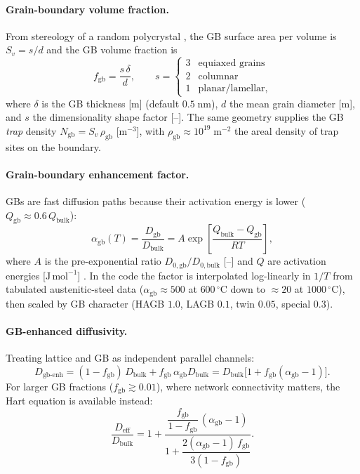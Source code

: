 \documentclass[11pt,a4paper]{article}
\newcommand{\Deff}{D_{\mathrm{eff}}}
\newcommand{\fgb}{f_{\mathrm{gb}}}
\begin{document}
\paragraph{Grain-boundary volume fraction.} From stereology of a random
polycrystal \citep{underwood1970}, the GB surface area per volume is
$S_v = s/d$ and the GB volume fraction is
\begin{equation}
  \fgb = \frac{s\,\delta}{d}, \qquad
  s = \begin{cases} 3 & \text{equiaxed grains}\\ 2 & \text{columnar}\\ 1 & \text{planar/lamellar}, \end{cases}
  \label{eq:fgb}
\end{equation}
where $\delta$ is the GB thickness [m] (default $0.5\;\mathrm{nm}$), $d$ the
mean grain diameter [m], and $s$ the dimensionality shape factor [--]. The
same geometry supplies the GB \emph{trap} density
$N_{\mathrm{gb}} = S_v\,\rho_{\mathrm{gb}}$ [$\mathrm{m^{-3}}$], with
$\rho_{\mathrm{gb}} \approx 10^{19}\;\mathrm{m^{-2}}$ the areal density of
trap sites on the boundary.

\paragraph{Grain-boundary enhancement factor.} GBs are fast diffusion paths
because their activation energy is lower ($Q_{\mathrm{gb}} \approx
0.6\,Q_{\mathrm{bulk}}$):
\begin{equation}
  \alpha_{\mathrm{gb}}(T) = \frac{D_{\mathrm{gb}}}{D_{\mathrm{bulk}}}
  = A \exp\!\left[\frac{Q_{\mathrm{bulk}} - Q_{\mathrm{gb}}}{RT}\right],
  \label{eq:gbenh}
\end{equation}
where $A$ is the pre-exponential ratio $D_{0,\mathrm{gb}}/D_{0,\mathrm{bulk}}$
[--] and $Q$ are activation energies [$\mathrm{J\,mol^{-1}}$]
\citep{tsuru1982,brass1996}. In the code the factor is interpolated
log-linearly in $1/T$ from tabulated austenitic-steel data
($\alpha_{\mathrm{gb}} \approx 500$ at $600\,^\circ$C down to $\approx 20$ at
$1000\,^\circ$C), then scaled by GB character (HAGB $1.0$, LAGB $0.1$, twin
$0.05$, special $0.3$).

\paragraph{GB-enhanced diffusivity.} Treating lattice and GB as independent
parallel channels:
\begin{equation}
  D_{\mathrm{gb\text{-}enh}}
  = (1-\fgb)\,D_{\mathrm{bulk}} + \fgb\,\alpha_{\mathrm{gb}} D_{\mathrm{bulk}}
  = D_{\mathrm{bulk}}\bigl[1 + \fgb(\alpha_{\mathrm{gb}}-1)\bigr].
  \label{eq:gbparallel}
\end{equation}
For larger GB fractions ($\fgb \gtrsim 0.01$), where network connectivity
matters, the Hart equation \citep{hart1957} is available instead:
\begin{equation}
  \frac{\Deff}{D_{\mathrm{bulk}}}
  = 1 + \frac{\dfrac{\fgb}{1-\fgb}\,( \alpha_{\mathrm{gb}} - 1)}
             {1 + \dfrac{2(\alpha_{\mathrm{gb}}-1)\,\fgb}{3(1-\fgb)}}.
  \label{eq:hart}
\end{equation}
\end{document}
